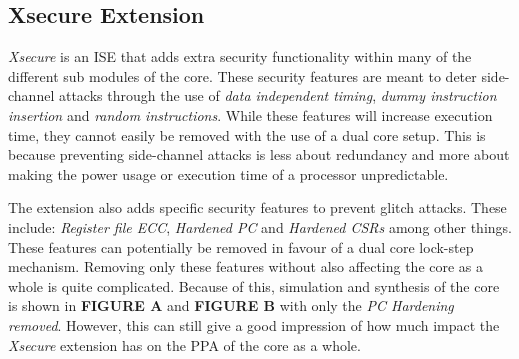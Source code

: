 \subsection{Xsecure Extension}

\textit{Xsecure} is an ISE that adds extra security functionality within many of the different sub modules of the core. These security features are meant to deter side-channel attacks through the use of \textit{data independent timing}, \textit{dummy instruction insertion} and \textit{random instructions}\cite{cv32e40s_manual}. While these features will increase execution time, they cannot easily be removed with the use of a dual core setup. This is because preventing side-channel attacks is less about redundancy and more about making the power usage or execution time of a processor unpredictable. 

The extension also adds specific security features to prevent glitch attacks. These include: \textit{Register file ECC}, \textit{Hardened PC} and \textit{Hardened CSRs} among other things. These features can potentially be removed in favour of a dual core lock-step mechanism. Removing only these features without also affecting the core as a whole is quite complicated. Because of this, simulation and synthesis of the core is shown in \textbf{FIGURE A} and \textbf{FIGURE B} with only the \textit{PC Hardening removed}. However, this can still give a good impression of how much impact the \textit{Xsecure} extension has on the PPA of the core as a whole. 


